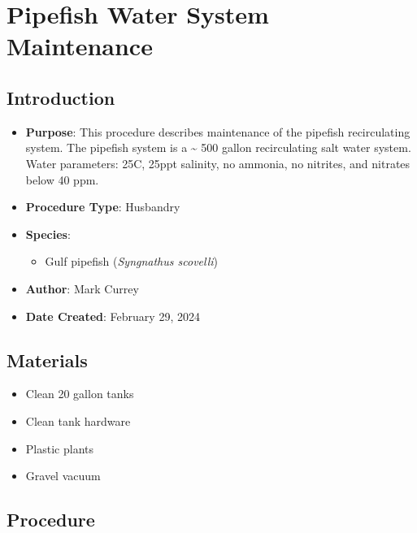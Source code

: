 \documentclass[
  letterpaper,
  DIV=11,
  numbers=noendperiod]{scrreprt}
\providecommand{\tightlist}{%
  \setlength{\itemsep}{0pt}\setlength{\parskip}{0pt}}\usepackage{longtable,booktabs,array}
\begin{document}
\hypertarget{sec-general_pipefish_tank_maint}{%
\chapter{Pipefish Water System
Maintenance}\label{sec-general_pipefish_tank_maint}}

\hypertarget{introduction-35}{%
\section{Introduction}\label{introduction-35}}

\begin{itemize}
\tightlist
\item
  \textbf{Purpose}: This procedure describes maintenance of the pipefish
  recirculating system. The pipefish system is a \textasciitilde{} 500
  gallon recirculating salt water system. Water parameters: 25C, 25ppt
  salinity, no ammonia, no nitrites, and nitrates below 40 ppm.
\item
  \textbf{Procedure Type}: Husbandry
\item
  \textbf{Species}:

  \begin{itemize}
  \tightlist
  \item
    Gulf pipefish (\emph{Syngnathus scovelli})
  \end{itemize}
\item
  \textbf{Author}: Mark Currey\\
\item
  \textbf{Date Created}: February 29, 2024
\end{itemize}

\hypertarget{materials-33}{%
\section{Materials}\label{materials-33}}

\begin{itemize}
\tightlist
\item
  Clean 20 gallon tanks
\item
  Clean tank hardware
\item
  Plastic plants
\item
  Gravel vacuum
\end{itemize}

\hypertarget{procedure-34}{%
\section{Procedure}\label{procedure-34}}
\end{document}
